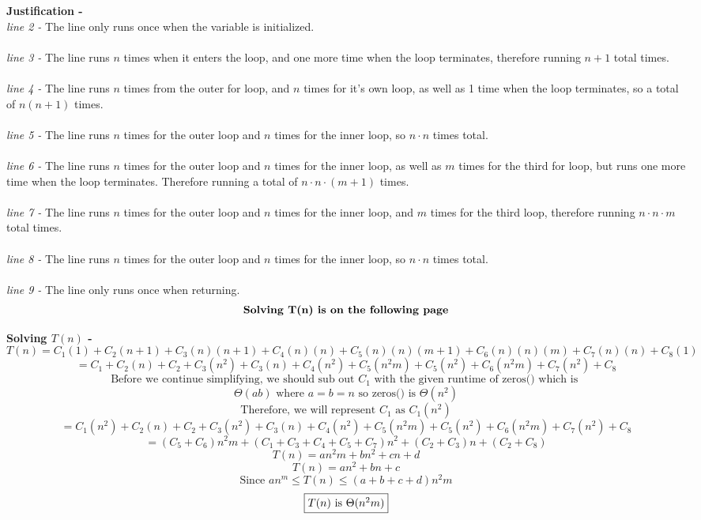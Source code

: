 \documentclass[9pt]{article}
\begin{document}
\textbf{Justification - }\\
	\textit{line 2 -}  The line only runs once when the variable is initialized.\\
	\\\textit{line 3 -} The line runs $n$ times when it enters the loop, and one more time when the loop terminates, therefore running $n+1$ total times.\\
	\\\textit{line 4 -} The line runs $n$ times from the outer for loop, and $n$ times for it's own loop, as well as 1 time when the loop terminates, so a total of $n(n+1)$ times.\\
	\\\textit{line 5 -} The line runs $n$ times for the outer loop and $n$ times for the inner loop, so $n\cdot n $ times total.\\
	\\\textit{line 6 -} The line runs $n$ times for the outer loop and $n$ times for the inner loop, as well as $m$ times for the third for loop, but runs one more time when the loop terminates. Therefore running a total of $n \cdot n \cdot (m+1)$ times. \\
	\\\textit{line 7 -} The line runs $n$ times for the outer loop and $n$ times for the inner loop, and $m$ times for the third loop, therefore running $n \cdot n \cdot m$ total times.\\
	\\\textit{line 8 -} The line runs $n$ times for the outer loop and $n$ times for the inner loop, so $n\cdot n $ times total.\\
	\\\textit{line 9 -} The line only runs once when returning.\\


	$$\text{\textbf{Solving T(n) is on the following page}}$$
\newpage

\textbf{Solving $T(n)$ -}\\
	$$T(n) = C_1 (1) + C_2 (n+1) + C_3 (n)(n+1) + C_4 (n)(n) + C_5 (n)(n)(m+1) + C_6 (n)(n)(m) + C_7 (n)(n) + C_8 (1)$$
	$$ = C_1 + C_2 (n)+ C_2 + C_3 (n^2) + C_3 (n) + C_4 (n^2) + C_5 (n^2 m) + C_5 (n^2) + C_6 (n^2 m) + C_7 (n^2) + C_8$$
	$$ \text{Before we continue simplifying, we should sub out } C_1 \text{ with the given runtime of zeros() which is }$$
	$$ \Theta (ab) \text { where } a = b = n \text{ so zeros() is } \Theta (n^2)$$
	$$\text{Therefore, we will represent } C_1 \text{ as } C_1 (n^2)$$
	$$ = C_1 (n^2) + C_2 (n)+ C_2 + C_3 (n^2) + C_3 (n) + C_4 (n^2) + C_5 (n^2 m) + C_5 (n^2) + C_6 (n^2 m) + C_7 (n^2) + C_8$$
	$$ = (C_5 + C_6)n^2m + (C_1 + C_3 + C_4 + C_5 + C_7)n^2 + (C_2 + C_3)n + (C_2 + C_8)$$
	$$ T(n) =  a n^2m + b n^2 + c n  + d$$
	$$ T(n) =  a n^2 + b n + c$$
	$$\text{Since } an^m \leq T(n) \leq (a + b + c + d)n^2m$$
	\begin{align}
		\boxed{$$ T(n) \text{ is } \Theta (n^2m)$$} \nonumber
	\end {align} 
\fi
\end{document}
